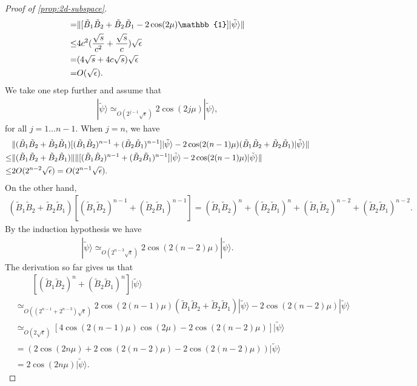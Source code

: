 \documentclass[11pt,letterpaper]{article}
\newcommand{\ket}[1]{|#1\rangle}
\DeclarePairedDelimiter{\norm}{\lVert}{\rVert}
\newcommand{\1}{\mathbb{1}}
\newcommand{\tB}{\tilde{B}}
\newcommand{\tpsi}{\tilde{\psi}}
\newcommand{\appd}[1]{\simeq_{#1}}
\theoremstyle{definition}
\begin{document}
\begin{proof}[Proof of \cref{prop:2d-subspace}]
\begin{align*}
		=& \norm{ [\tB_1\tB_2 + \tB_2\tB_1 - 2 \cos(2\mu) \1]\ket{\tpsi}} \\
		\leq& 4c^2(\frac{\sqrt{s}}{c^2}+ \frac{\sqrt{s}}{c})\sqrt{\epsilon} \\
		=& (4\sqrt{s} + 4c\sqrt{s})\sqrt{\epsilon}\\
		=& O(\sqrt{\epsilon}).
	\end{align*}
	We take one step further and assume that 
	\begin{align}
		[(\tB_1\tB_2)^j + (\tB_2\tB_1)^j]\ket{\tpsi} \appd{O(2^{j-1}\sqrt{\epsilon})} 2\cos(2j\mu) \ket{\tpsi},
	\end{align}
	for all $j =1\dots n-1$.
	When $j=n$, we have
	\begin{align}
		&\norm{ (\tB_1\tB_2+\tB_2\tB_1)[(\tB_1\tB_2)^{n-1} + (\tB_2\tB_1)^{n-1}]\ket{\tpsi} - 2\cos(2(n-1)\mu)(\tB_1\tB_2+\tB_2\tB_1)\ket{\tpsi}}\\
		\leq& \norm{(\tB_1\tB_2+\tB_2\tB_1)} \norm{ [(\tB_1\tB_2)^{n-1} + (\tB_2\tB_1)^{n-1}]\ket{\tpsi} - 2\cos(2(n-1)\mu)\ket{\tpsi}}\\
		\leq & 2 O(2^{n-2} \sqrt{\epsilon}) = O(2^{n-1} \sqrt{\epsilon}).
	\end{align}
	On the other hand,
	\begin{align}
		 (\tB_1\tB_2+\tB_2\tB_1)[(\tB_1\tB_2)^{n-1} + (\tB_2\tB_1)^{n-1}] = 
		 (\tB_1\tB_2)^{n} + (\tB_2\tB_1)^{n}+ (\tB_1\tB_2)^{n-2} + (\tB_2\tB_1)^{n-2}.
	\end{align}
	By the induction hypothesis we have 
	\begin{align}
		[(\tB_1\tB_2)^{n-2} + (\tB_2\tB_1)^{n-2}] \ket{\tpsi} \appd{O(2^{n-3} \sqrt{\epsilon})} 2\cos(2(n-2)\mu) \ket{\tpsi}.
	\end{align}
	The derivation so far gives us that
	\begin{align}
		&\qquad[(\tB_1\tB_2)^{n} + (\tB_2\tB_1)^{n}] \ket{\tpsi} \\
		&\appd{O((2^{n-1}+2^{n-3})\sqrt{\epsilon})} 2\cos(2(n-1)\mu)(\tB_1\tB_2+\tB_2\tB_1)\ket{\tpsi} - 2\cos(2(n-2)\mu) \ket{\tpsi}\\
		&\appd{O(2\sqrt{\epsilon})} [4\cos(2(n-1)\mu)\cos(2\mu) - 2\cos(2(n-2)\mu)]\ket{\tpsi}\\
		&= (2\cos(2n\mu) + 2\cos(2(n-2)\mu) - 2\cos(2(n-2)\mu))\ket{\tpsi}\\
		&=2\cos(2n\mu) \ket{\tpsi}.
	\end{align}
	

\end{proof}
\end{document}
